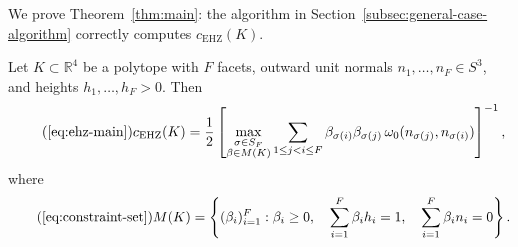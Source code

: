 %
%

We prove Theorem~\ref{thm:main}: the algorithm in
Section~\ref{subsec:general-case-algorithm} correctly computes
$c_{\mathrm{EHZ}}(K)$.

\begin{theorem*}
Let $K \subset \mathbb{R}^4$ be a polytope
with $F$ facets, outward unit normals $n_1, \ldots, n_F \in S^3$,
and heights $h_1, \ldots, h_F > 0$.
Then
\begin{equation}\tag{\ref{eq:ehz-main}}
  c_{\mathrm{EHZ}}(K) = \frac{1}{2}
  \left[
    \max_{\substack{
      \sigma \in S_F \\
      \beta \in M(K)
    }}
    \sum_{1 \leq j < i \leq F}
      \beta_{\sigma(i)} \beta_{\sigma(j)} \,
      \omega_0(n_{\sigma(j)}, n_{\sigma(i)})
  \right]^{-1},
\end{equation}
where
\begin{equation}\tag{\ref{eq:constraint-set}}
  M(K) = \left\{
    (\beta_i)_{i=1}^{F} :
    \beta_i \geq 0, \quad
    \sum_{i=1}^{F} \beta_i h_i = 1, \quad
    \sum_{i=1}^{F} \beta_i n_i = 0
  \right\}.
\end{equation}
\end{theorem*}

